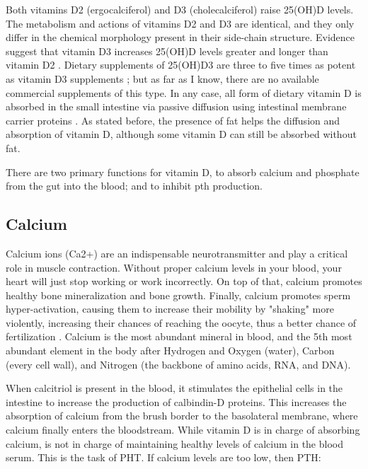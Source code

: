 Both vitamins D2 (ergocalciferol) and D3 (cholecalciferol) raise 25(OH)D levels. The metabolism and actions of vitamins D2 and D3 are identical, and they only differ in the chemical morphology present in their side-chain structure. Evidence suggest that vitamin D3 increases 25(OH)D levels greater and longer than vitamin D2 \cite{ref:Tripkovic2012, ref:Lehmann2013, ref:Logan2012, ref:Tripkovic2017}. Dietary supplements of 25(OH)D3 are three to five times as potent as vitamin D3 supplements \cite{ref:GraeffArmas2019, ref:QuesadaGomez2018}; but as far as I know, there are no available commercial supplements of this type. In any case, all form of dietary vitamin D is absorbed in the small intestine via passive diffusion using intestinal membrane carrier proteins \cite{ref:Silva2017}. As stated before, the presence of fat helps the diffusion and absorption of vitamin D, although some vitamin D can still be absorbed without fat.

There are two primary functions for vitamin D, to absorb calcium and phosphate from the gut into the blood; and to inhibit \gls{pth} production.

\subsection{Calcium}
\label{vd:calcium}

Calcium ions (Ca2+) are an indispensable neurotransmitter and play a critical role in muscle contraction. Without proper calcium levels in your blood, your heart will just stop working or work incorrectly. On top of that, calcium promotes healthy bone mineralization and bone growth. Finally, calcium promotes sperm hyper-activation, causing them to increase their mobility by "shaking" more violently, increasing their chances of reaching the oocyte, thus a better chance of fertilization \cite{ref:1_Institute_of_Medicine2011-zg, ref:2_Limongi2017-al, ref:3_680f7627099e40be878db46152ebe484}. Calcium is the most abundant mineral in blood, and the 5th most abundant element in the body after Hydrogen and Oxygen (water), Carbon (every cell wall), and Nitrogen (the backbone of amino acids, RNA, and DNA).

When calcitriol is present in the blood, it stimulates the epithelial cells in the intestine to increase the production of calbindin-D proteins. This increases the absorption of calcium from the brush border to the basolateral membrane, where calcium finally enters the bloodstream. While vitamin D is in charge of absorbing calcium, is not in charge of maintaining healthy levels of calcium in the blood serum. This is the task of PHT. If calcium levels are too low, then PTH:

